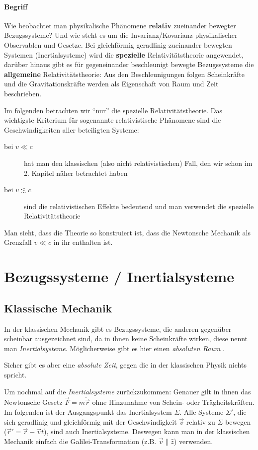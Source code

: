 \documentclass[oneside]{book}
\theoremstyle{definition}
\newcommand{\ddotvec}[1]{\ddot{\vec{#1}}}
\begin{document}
\paragraph{Begriff} Wie beobachtet man physikalische Phänomene \textbf{relativ} zueinander bewegter Bezugssysteme? Und wie steht es um die Invarianz/Kovarianz physikalischer Observablen und Gesetze.
Bei gleichförmig geradlinig zueinander bewegten Systemen (Inertialsysteme) wird die \textbf{spezielle} Relativitätstheorie angewendet, darüber hinaus gibt es für gegeneinander beschleunigt bewegte Bezugssysteme die \textbf{allgemeine} Relativitätstheorie: Aus den Beschleunigungen folgen Scheinkräfte und die Gravitationskräfte werden als Eigenschaft von Raum und Zeit beschrieben.

Im folgenden betrachten wir "`nur"' die spezielle Relativitätstheorie.
Das wichtigste Kriterium für sogenannte relativistische Phänomene sind die Geschwindigkeiten aller beteiligten Systeme:
\begin{description}
	\item[bei $v \ll c$] hat man den klassischen (also nicht relativistischen) Fall, den wir schon im 2. Kapitel näher betrachtet haben
	\item[bei $v \lesssim c $] sind die relativistischen Effekte bedeutend und man verwendet die spezielle Relativitätstheorie
\end{description}
Man sieht, dass die Theorie so konstruiert ist, dass die Newtonsche Mechanik als Grenzfall $v \ll c$ in ihr enthalten ist.

\section{Bezugssysteme / Inertialsysteme}
\subsection{Klassische Mechanik}
In der klassischen Mechanik gibt es Bezugssysteme, die anderen gegenüber scheinbar ausgezeichnet sind, da in ihnen keine Scheinkräfte wirken, diese nennt man \textit{Inertialsysteme}. Möglicherweise gibt es hier einen \textit{absoluten Raum} .

Sicher gibt es aber eine \textit{absolute Zeit}, gegen die in der klassischen Physik nichts spricht.

Um nochmal auf die \textit{Inertialsysteme} zurückzukommen: Genauer gilt in ihnen das Newtonsche Gesetz $\vec{F} = m \ddotvec{r}$ ohne Hinzunahme von Schein- oder Trägheitskräften. Im folgenden ist der Ausgangspunkt das Inertialsystem $\Sigma$.
Alle Systeme $\Sigma'$, die sich geradlinig und gleichförmig mit der Geschwindigkeit $\vec v$ relativ zu $\Sigma$ bewegen ($\vec{r}' = \vec{r} - \vec{v}t$), sind auch Inertialsysteme. Deswegen kann man in der klassischen Mechanik einfach die Galilei-Transformation (z.B. $\vec{v} \parallel \hat{z}$) verwenden.
\end{document}
